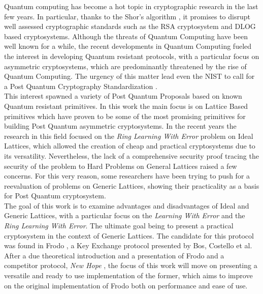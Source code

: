 Quantum computing has become a hot topic in cryptographic research in the last few years. In particular, thanks to the Shor's algorithm \cite{ShorAlgo}, it promises to disrupt well assessed cryptographic standards such as the RSA cryptosystem and DLOG based cryptosystems. Although the threats of Quantum Computing have been well known for a while, the recent developments in Quantum Computing fueled the interest in developing Quantum resistant protocols, with a particular focus on asymmetric cryptosystems, which are predominantly threatened by the rise of Quantum Computing. The urgency of this matter lead even the NIST to call for a Post Quantum Cryptography Standardization \cite{NIST}.\\
This interest spawned a variety of Post Quantum Proposals based on known Quantum resistant primitives. In this work the main focus is on Lattice Based primitives which have proven to be some of the most promising primitives for building Post Quantum asymmetric cryptosystems. In the recent years the research in this field focused on the \textit{Ring Learning With Error} problem on Ideal Lattices, which allowed the creation of cheap and practical cryptosystems due to its versatility. Nevertheless, the lack of a comprehensive security proof tracing the security of the problem to Hard Problems on General Lattices raised a few concerns. For this very reason, some researchers have been trying to push for a reevaluation of problems on Generic Lattices, showing their practicality as a basis for Post Quantum cryptosystem.\\
The goal of this work is to examine advantages and disadvantages of Ideal and Generic Lattices, with a particular focus on the \textit{Learning With Error} and the \textit{Ring Learning With Error}. The ultimate goal being to present a practical cryptosystem in the context of Generic Lattices. The candidate for this protocol was found in Frodo \cite{frodo}, a Key Exchange protocol presented by Bos, Costello et al. After a due theoretical introduction and a presentation of Frodo and a competitor protocol, \textit{New Hope} \cite{newhope}, the focus of this work will move on presenting a versatile and ready to use implementation of the former, which aims to improve on the original implementation of Frodo both on performance and ease of use.